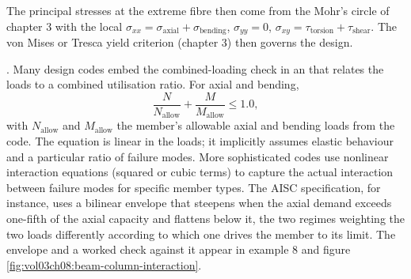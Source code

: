 The principal stresses at the extreme fibre then come from the Mohr's
circle of chapter 3 with the local $\sigma_{xx} = \sigma_{\text{axial}}
+ \sigma_{\text{bending}}$, $\sigma_{yy} = 0$, $\sigma_{xy} =
\tau_{\text{torsion}} + \tau_{\text{shear}}$. The von Mises or Tresca
yield criterion (chapter 3) then governs the design.

. Many design codes embed the
combined-loading check in an  that
relates the loads to a combined utilisation ratio. For axial and
bending,
\[
\frac{N}{N_{\text{allow}}} + \frac{M}{M_{\text{allow}}} \leq 1.0,
\]
with $N_{\text{allow}}$ and $M_{\text{allow}}$ the member's
allowable axial and bending loads from the code. The equation is
linear in the loads; it implicitly assumes elastic behaviour and a
particular ratio of failure modes. More sophisticated codes use
nonlinear interaction equations (squared or cubic terms) to capture
the actual interaction between failure modes for specific member
types. The AISC specification, for instance, uses a bilinear envelope
that steepens when the axial demand exceeds one-fifth of the axial
capacity and flattens below it, the two regimes weighting the two
loads differently according to which one drives the member to its
limit. The envelope and a worked check against it appear in example 8
and figure \ref{fig:vol03ch08:beam-column-interaction}.

